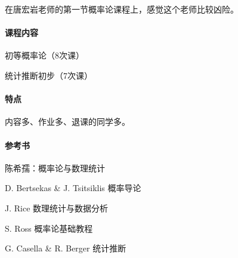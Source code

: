 \preface

在唐宏岩老师的第一节概率论课程上，感觉这个老师比较凶险。

\paragraph{课程内容}
\begin{compactenum}
	\item 初等概率论（8次课）
	\item 统计推断初步（7次课）
\end{compactenum}

\paragraph{特点}
内容多、作业多、退课的同学多。

\paragraph{参考书}
\begin{compactitem}
	\item 陈希孺：概率论与数理统计
	\item D. Bertsekas \& J. Tsitsiklis 概率导论
	\item J. Rice 数理统计与数据分析
	\item S. Ross 概率论基础教程
	\item G. Casella \& R. Berger 统计推断
\end{compactitem}